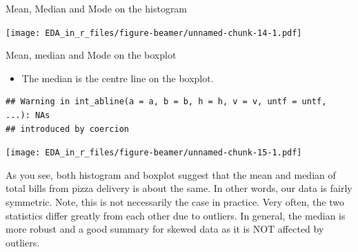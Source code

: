\documentclass[ignorenonframetext,]{beamer}
\newenvironment{Shaded}{\begin{snugshade}}{\end{snugshade}}
\newcommand{\KeywordTok}[1]{\textcolor[rgb]{0.13,0.29,0.53}{\textbf{#1}}}
\newcommand{\DataTypeTok}[1]{\textcolor[rgb]{0.13,0.29,0.53}{#1}}
\newcommand{\StringTok}[1]{\textcolor[rgb]{0.31,0.60,0.02}{#1}}
\newcommand{\OperatorTok}[1]{\textcolor[rgb]{0.81,0.36,0.00}{\textbf{#1}}}
\newcommand{\NormalTok}[1]{#1}
\providecommand{\tightlist}{%
  \setlength{\itemsep}{0pt}\setlength{\parskip}{0pt}}
\begin{document}
\begin{frame}[fragile]{Mean, Median and Mode on the histogram}

\begin{Shaded}
\end{Shaded}

\texttt{[image: EDA\_in\_r\_files/figure-beamer/unnamed-chunk-14-1.pdf]}

\end{frame}

\begin{frame}[fragile]{Mean, median and Mode on the boxplot}

\begin{itemize}
\tightlist
\item
  The median is the centre line on the boxplot.
\end{itemize}

\begin{Shaded}
\end{Shaded}

\begin{verbatim}
## Warning in int_abline(a = a, b = b, h = h, v = v, untf = untf, ...): NAs
## introduced by coercion
\end{verbatim}

\texttt{[image: EDA\_in\_r\_files/figure-beamer/unnamed-chunk-15-1.pdf]}

As you see, both histogram and boxplot suggest that the mean and median
of total bills from pizza delivery is about the same. In other words,
our data is fairly symmetric. Note, this is not necessarily the case in
practice. Very often, the two statistics differ greatly from each other
due to outliers. In general, the median is more robust and a good
summary for skewed data as it is NOT affected by outliers.

\end{frame}
\end{document}
